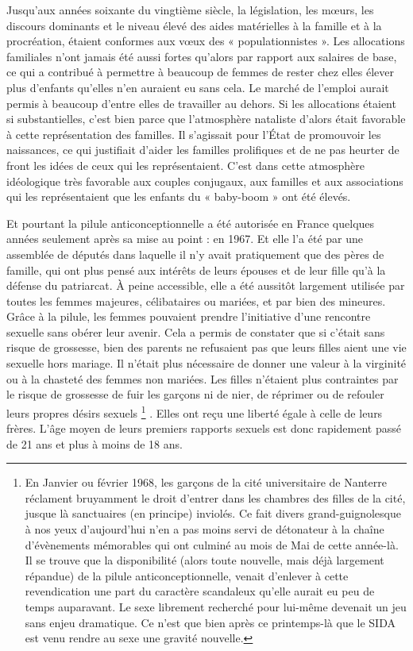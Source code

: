  Jusqu'aux années soixante du vingtième siècle, la législation, les mœurs, les discours dominants et le niveau élevé des aides matérielles à la famille et à la procréation, étaient conformes aux vœux des « populationnistes ». Les allocations familiales n'ont jamais été aussi fortes qu'alors par rapport aux salaires de base, ce qui a contribué à permettre à beaucoup de femmes de rester chez elles élever plus d'enfants qu'elles n'en auraient eu sans cela. Le marché de l'emploi aurait permis à beaucoup d'entre elles de travailler au dehors. Si les allocations étaient si substantielles, c'est bien parce que l'atmosphère nataliste d'alors était favorable à cette représentation des familles. Il s'agissait pour l'État de promouvoir les naissances, ce qui justifiait d'aider les familles prolifiques et de ne pas heurter de front les idées de ceux qui les représentaient. C'est dans cette atmosphère idéologique très favorable aux couples conjugaux, aux familles et aux associations qui les représentaient que les enfants du « baby-boom » ont été élevés. 

 Et pourtant la pilule anticonceptionnelle a été autorisée en France quelques années seulement après sa mise au point : en 1967. Et elle l'a été par une assemblée de députés dans laquelle il n'y avait pratiquement que des pères de famille, qui ont plus pensé aux intérêts de leurs épouses et de leur fille qu'à la défense du patriarcat. À peine accessible, elle a été aussitôt largement utilisée par toutes les femmes majeures, célibataires ou mariées, et par bien des mineures. Grâce à la pilule, les femmes pouvaient prendre l'initiative d'une rencontre sexuelle sans obérer leur avenir. Cela a permis de constater que si c'était sans risque de grossesse, bien des parents ne refusaient pas que leurs filles aient une vie sexuelle hors mariage. Il n'était plus nécessaire de donner une valeur à la virginité ou à la chasteté des femmes non mariées. Les filles n'étaient plus contraintes par le risque de grossesse de fuir les garçons ni de nier, de réprimer ou de refouler leurs propres désirs sexuels%
\footnote{En Janvier ou février 1968, les garçons de la cité universitaire de Nanterre réclament bruyamment le droit d'entrer dans les chambres des filles de la cité, jusque là sanctuaires (en principe) inviolés. Ce fait divers grand-guignolesque à nos yeux d'aujourd'hui n'en a pas moins servi de détonateur à la chaîne d'évènements mémorables qui ont culminé au mois de Mai de cette année-là. Il se trouve que la disponibilité (alors toute nouvelle, mais déjà largement répandue) de la pilule anticonceptionnelle, venait d'enlever à cette revendication une part du caractère scandaleux qu'elle aurait eu peu de temps auparavant. Le sexe librement recherché pour lui-même devenait un jeu sans enjeu dramatique. Ce n'est que bien après ce printemps-là que le SIDA est venu rendre au sexe une gravité nouvelle.}%
. Elles ont reçu une liberté égale à celle de leurs frères. L'âge moyen de leurs premiers rapports sexuels est donc rapidement passé de 21 ans et plus à moins de 18 ans.

